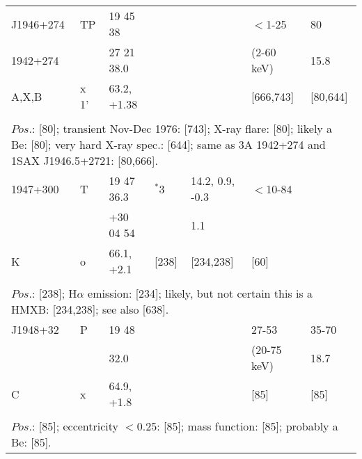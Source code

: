 \documentclass{aa}
\begin{document}
\begin{table*}[h]
\begin{tabular}{p{2.5cm}p{1cm}p{1.8cm}p{2.3cm}p{3.3cm}p{2.0cm}p{2.2cm}}
\noalign{\smallskip}
\hline
\noalign{\smallskip}
J1946+274       & TP    &  19 45 38    &             &        & $<$1-25            &   80   \\ 
1942+274         &           &  27 21 38.0 &             &       &  (2-60 keV)       &   15.8   \\
A,X,B                & x 1'    & 63.2, +1.38  &             &       &   [666,743]        &  [80,644]  \\
\\
\multicolumn{7}{p{17.5cm}}{
$Pos$.: [80]; transient Nov-Dec 1976: [743]; X-ray flare: [80];
likely a Be: [80]; very hard X-ray spec.: [644]; same as 3A 1942+274 and 1SAX J1946.5+2721: [80,666].      }\\

\noalign{\smallskip}
\hline
\noalign{\smallskip}
 1947+300     &   T       & 19 47 36.3     &  $^*$3            &  14.2, 0.9, -0.3     & $<$10-84          &          \\
                        &            & +30 04 54       &                        &  1.1                        &                           &          \\
K                     & o         & 66.1, +2.1       &             [238]  &  [234,238]            & [60]                   &           \\
\\
\multicolumn{7}{p{17.5cm}}{
$Pos$.: [238]; H$\alpha$ emission: [234]; likely, but not certain this is a HMXB: [234,238]; see also [638].}\\

\noalign{\smallskip}
\hline
\noalign{\smallskip}
                                                                  
J1948+32 &   P        &   19 48               &                      &             &  27-53                &       35-70   \\
                   &              &   32.0                 &                       &             &  (20-75 keV)    &        18.7   \\
C                &  x          & 64.9, +1.8          &                      &             &           [85]          &      [85]  \\
  
\\
\multicolumn{7}{p{17.5cm}}{
$Pos$.: [85]; eccentricity $<$0.25: [85]; mass function: [85]; probably a Be: [85].         }\\


\end{tabular}
\end{table*}
\end{document}
